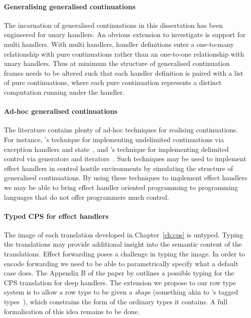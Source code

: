 \documentclass[12pt,phd,lfcs,twoside,openright,logo,leftchapter,normalheadings]{infthesis}
\theoremstyle{plain}
\theoremstyle{definition}
\begin{document}
\paragraph{Generalising generalised continuations} The incarnation of
generalised continuations in this dissertation has been engineered for
unary handlers. An obvious extension to investigate is support for
multi handlers. With multi handlers, handler definitions enter a
one-to-many relationship with pure continuations rather than an
one-to-one relationship with unary handlers. Thus at minimum the
structure of generalised continuation frames needs to be altered such
that each handler definition is paired with a list of pure
continuations, where each pure continuation represents a distinct
computation running under the handler.

\paragraph{Ad-hoc generalised continuations}
The literature contains plenty of ad-hoc techniques for realising
continuations. For instance, \citeauthor{PettyjohnCMKF05}'s technique
for implementing undelimited continuations via exception handlers and
state~\cite{PettyjohnCMKF05}, and \citeauthor{JamesS11}'s technique
for implementing delimited control via generators and
iterators~\cite{JamesS11}. Such techniques may be used to implement
effect handlers in control hostile environments by simulating the
structure of generalised continuations. By using these techniques to
implement effect handlers we may be able to bring effect handler
oriented programming to programming languages that do not offer
programmers much control.

\paragraph{Typed CPS for effect handlers} The image of each
translation developed in Chapter~\ref{ch:cps} is untyped. Typing the
translations may provide additional insight into the semantic content
of the translations. Effect forwarding poses a challenge in typing the
image.  In order to encode forwarding we need to be able to
parametrically specify what a default case does.
%
The Appendix B of the paper by \citet{HillerstromLAS17} outlines a
possible typing for the CPS translation for deep handlers.  The
extension we propose to our row type system is to allow a row type to
be given a \emph{shape} (something akin to
\citeauthor{BerthomieuS95}'s tagged types~\cite{BerthomieuS95}), which
constrains the form of the ordinary types it contains. A full
formalisation of this idea remains to be done.
\end{document}

